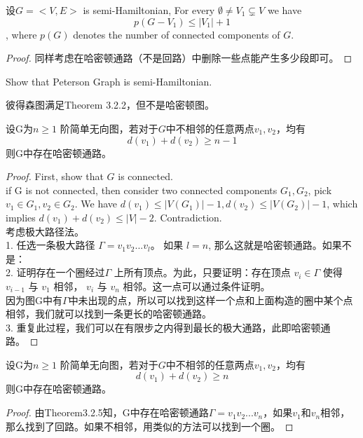 \documentclass[11pt,fleqn]{book} %
\begin{document}
\begin{CJK}{UTF8}{gkai}
\begin{corollary}
     设$G = < V, E>$ is semi-Hamiltonian, For every $\emptyset \neq V_1 \subsetneq{V}$ we have
    \[
        p(G - V_1) \leq |V_1| + 1 \], where $p(G)$ denotes the number of connected components of $G$.
\end{corollary}
\begin{proof}
    同样考虑在哈密顿通路（不是回路）中删除一些点能产生多少段即可。
\end{proof}

\begin{example}
     Show that Peterson Graph is semi-Hamiltonian.
\end{example}
\begin{remark}
    彼得森图满足Theorem 3.2.2，但不是哈密顿图。
\end{remark}

\begin{theorem}
     设G为$n \geq 1$ 阶简单无向图，若对于$G$中不相邻的任意两点$v_1,v_2$，均有
    \[
        d(v_1) + d(v_2) \geq n  - 1\]
    则G中存在哈密顿通路。
\end{theorem}
\begin{proof}
    First, show that $G$ is connected. \\
    if G is not connected, then consider two connected components $G_1, G_2$, pick $v_1 \in G_1, v_2 \in G_2$.
    We have $d(v_1) \leq |V(G_1)| - 1, d(v_2) \leq |V(G_2)| - 1$, which implies $d(v_1) + d(v_2) \leq |V| - 2$. Contradiction. \\
    考虑极大路径法。\\
    1. 任选一条极大路径 $\Gamma = v_1 v_2 ... v_l$。 如果 $l = n$, 那么这就是哈密顿通路。如果不是： \\
    2. 证明存在一个圈经过$\Gamma$ 上所有顶点。为此，只要证明：存在顶点 $v_i \in \Gamma$ 使得 $v_{i-1}$ 与 $v_1$ 相邻，
    $v_i$ 与 $v_n$ 相邻。这一点可以通过条件证明。 \\ 
    因为图G中有$\Gamma$中未出现的点，所以可以找到这样一个点和上面构造的圈中某个点相邻，我们就可以找到一条更长的哈密顿通路。\\
    3. 重复此过程，我们可以在有限步之内得到最长的极大通路，此即哈密顿通路。
\end{proof}

\begin{corollary}
     设G为$n \geq 1$ 阶简单无向图，若对于$G$中不相邻的任意两点$v_1,v_2$，均有
    \[
        d(v_1) + d(v_2) \geq n\]
    则G中存在哈密顿通路。
\end{corollary}
\begin{proof}
    由Theorem3.2.5知，G中存在哈密顿通路$\Gamma = v_1 v_2 ... v_n$，如果$v_1 和 v_n$相邻，那么找到了回路。如果不相邻，用类似的方法可以找到一个圈。    
\end{proof}


\end{CJK}
\end{document}
